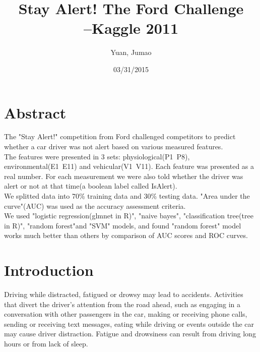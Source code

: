 \documentclass[11pt]{article}
\title{Stay Alert! The Ford Challenge\\
       \hfill --\small{Kaggle 2011}}
\author{Yuan, Jumao}
\date{03/31/2015}
\begin{document}

\maketitle


\setlength\parindent{0pt} %
\singlespacing



\tableofcontents
\newpage
\doublespacing  %
\section{Abstract}
The "Stay Alert!" competition from Ford challenged competitors to predict whether a car driver was not alert based on various measured features.\\
The features were presented in 3 sets: physiological(P1~P8), environmental(E1~E11) and vehicular(V1~V11). Each feature was presented as a real number. For each measurement we were also told whether the driver was alert or not at that time(a boolean label called IsAlert).\\
We splitted data into 70\% training data and 30\% testing data. "Area under the curve"(AUC) was used as the accuracy assessment criteria. \\
We used "logistic regression(glmnet in R)", "naive bayes", "classification tree(tree in R)", "random forest"and "SVM" models, and found "random forest" model works much better than others by comparison of AUC scores and ROC curves.

\section{Introduction} %
Driving while distracted, fatigued or drowsy may lead to accidents. Activities that divert the driver's attention from the road ahead, such as engaging in a conversation with other passengers in the car, making or receiving phone calls, sending or receiving text messages, eating while driving or events outside the car may cause driver distraction. Fatigue and drowsiness can result from driving long hours or from lack of sleep.
\end{document}
